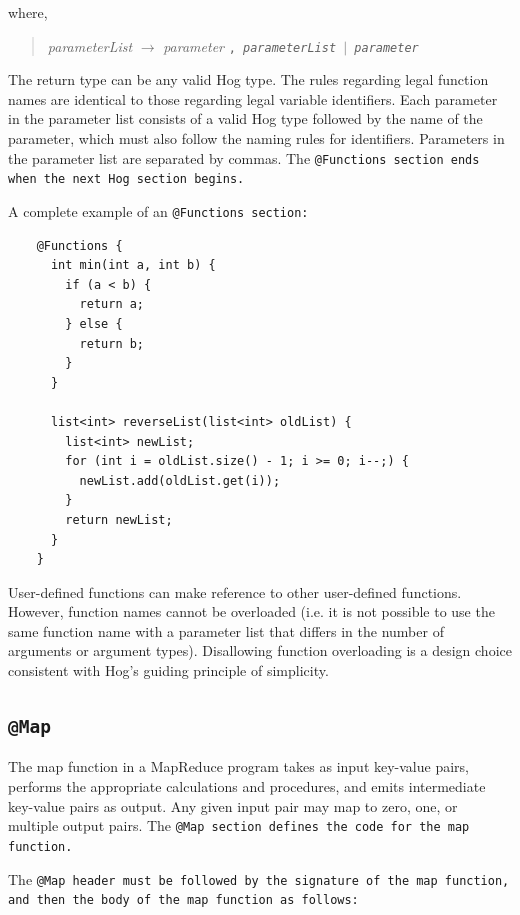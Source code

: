 \documentclass{book}
\begin{document}
where,

\begin{quotation} \emph{parameterList} $\rightarrow$ \emph{parameter} \tt , \rm
\emph{parameterList} $|$ \emph{parameter} \end{quotation}

The return type can be any valid Hog type. The rules regarding legal function
names are identical to those regarding legal variable identifiers. Each
parameter in the parameter list consists of a valid Hog type followed by the
name of the parameter, which must also follow the naming rules for identifiers.
Parameters in the parameter list are separated by commas. The \tt @Functions
\rm section ends when the next Hog section begins.

A complete example of an \tt @Functions \rm section:

\begin{verbatim}
    @Functions {
      int min(int a, int b) {
        if (a < b) {
          return a;
        } else {
          return b;
        }
      }

      list<int> reverseList(list<int> oldList) {
        list<int> newList;
        for (int i = oldList.size() - 1; i >= 0; i--;) {
          newList.add(oldList.get(i));
        }
        return newList;
      }
    }
\end{verbatim}

User-defined functions can make reference to other user-defined functions.
However, function names cannot be overloaded (i.e. it is not possible to use
the same function name with a parameter list that differs in the number of
arguments or argument types). Disallowing function overloading is a design
choice consistent with Hog's guiding principle of simplicity.


\subsection{\tt @Map \rm} %
\label{sub:tt_map_rm}

The map function in a MapReduce program takes as input key-value pairs, performs
the appropriate calculations and procedures, and emits intermediate key-value
pairs as output. Any given input pair may map to zero, one, or multiple output
pairs. The \tt @Map \rm section defines the code for the map function.

The \tt @Map \rm header must be followed by the signature of the map function, and
then the body of the map function as follows:
\end{document}
